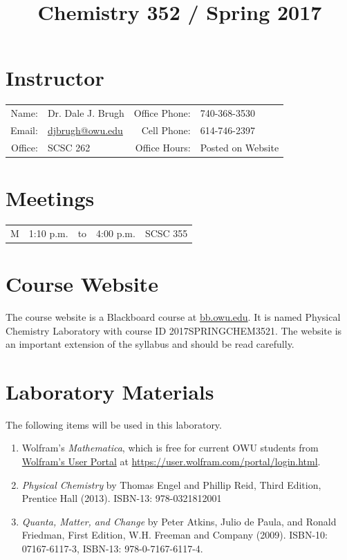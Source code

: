 \documentclass[letterpaper,oneside,onecolumn,11pt,article]{memoir}
\title{Chemistry 352 / Spring 2017}
\date{}
\author{}
\begin{document}
\maketitle
\thispagestyle{courseinformationtitle}
%
%
\section{Instructor}
\begin{tabular}{rl|rl}
Name: & Dr. Dale J. Brugh & Office Phone: & 740-368-3530 \\
Email: & \href{mailto:djbrugh@owu.edu}{djbrugh@owu.edu} & Cell Phone: & 614-746-2397 \\
Office: & SCSC 262 & Office Hours: & Posted on Website \\
\end{tabular}
%
%
\section{Meetings}
\begin{tabular}{crcrl}
M & 1:10 p.m. & to & 4:00 p.m. & SCSC 355 \\
\end{tabular}

\section{Course Website}
The course website is a Blackboard course at \href{https://bb.owu.edu}{bb.owu.edu}. It is named Physical Chemistry Laboratory with course ID 2017SPRINGCHEM3521. The website is an important extension of the syllabus and should be read carefully.

\section{Laboratory Materials}
The following items will be used in this laboratory. 
\begin{enumerate}[1.]
\item Wolfram's \emph{Mathematica}, which is free for current OWU students from \href{https://user.wolfram.com/portal/login.html}{Wolfram's User Portal} at \href{https://user.wolfram.com/portal/login.html}{https://user.wolfram.com/portal/login.html}. 
\item \emph{Physical Chemistry} by Thomas Engel and Phillip Reid, Third Edition, Prentice Hall (2013).  ISBN-13: 978-0321812001
\item \emph{Quanta, Matter, and Change} by Peter Atkins, Julio de Paula, and Ronald Friedman, First Edition, W.H. Freeman and Company (2009). ISBN-10: 07167-6117-3, ISBN-13: 978-0-7167-6117-4.
\end{enumerate}
\end{document}
